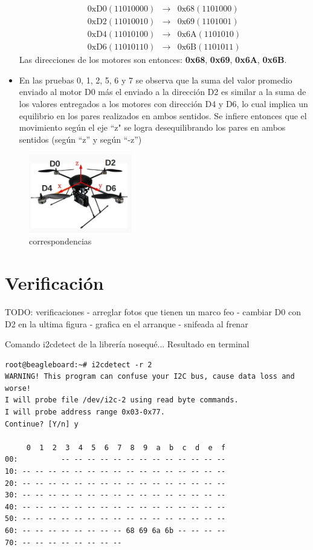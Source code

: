 \documentclass[spanish,12pt,a4paper,titlepage]{report}
\begin{document}
\begin{itemize}
\begin{eqnarray}
\mathrm{0xD0} (11010000) &\longrightarrow &\mathrm{0x68} (1101000) \\
\mathrm{0xD2} (11010010) &\longrightarrow &\mathrm{0x69} (1101001) \\
\mathrm{0xD4} (11010100) &\longrightarrow &\mathrm{0x6A} (1101010) \\
\mathrm{0xD6} (11010110) &\longrightarrow &\mathrm{0x6B} (1101011) 
\end{eqnarray}
Las direcciones de los motores son entonces: \textbf{0x68}, \textbf{0x69}, \textbf{0x6A}, \textbf{0x6B}.
\item En las pruebas 0, 1, 2, 5, 6 y 7 se observa que la suma del valor promedio enviado al motor D0 más el enviado a la dirección D2 es similar a la suma de los valores entregados a los motores con dirección D4 y D6, lo cual implica un equilibrio en los pares realizados en ambos sentidos. Se infiere entonces que el movimiento según el eje ``z" se logra desequilibrando los pares en ambos sentidos (según ``z'' y según ``-z'')
\end{itemize}

\begin{figure}[h!]
	\centering
	\includegraphics[width=0.4\textwidth]{./pics/correspondencias.jpg}
	\caption{correspondencias}
	\label{fig:correspondencias}
\end{figure}

\section{Verificación}
\begin{huge}
TODO: verificaciones - arreglar fotos que tienen un marco feo - cambiar D0 con D2 en la ultima figura - grafica en el arranque - snifeada al frenar
\end{huge}

Comando i2cdetect de la librería nosequé... Resultado en terminal
\begin{verbatim}
root@beagleboard:~# i2cdetect -r 2
WARNING! This program can confuse your I2C bus, cause data loss and worse!
I will probe file /dev/i2c-2 using read byte commands.
I will probe address range 0x03-0x77.
Continue? [Y/n] y

     0  1  2  3  4  5  6  7  8  9  a  b  c  d  e  f
00:          -- -- -- -- -- -- -- -- -- -- -- -- -- 
10: -- -- -- -- -- -- -- -- -- -- -- -- -- -- -- -- 
20: -- -- -- -- -- -- -- -- -- -- -- -- -- -- -- -- 
30: -- -- -- -- -- -- -- -- -- -- -- -- -- -- -- -- 
40: -- -- -- -- -- -- -- -- -- -- -- -- -- -- -- -- 
50: -- -- -- -- -- -- -- -- -- -- -- -- -- -- -- -- 
60: -- -- -- -- -- -- -- -- 68 69 6a 6b -- -- -- -- 
70: -- -- -- -- -- -- -- --
\end{verbatim}
\end{document}
